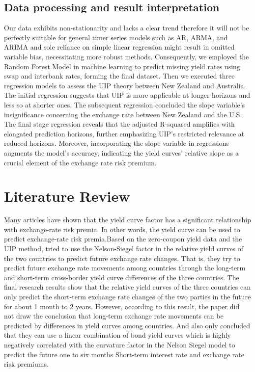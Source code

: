 \documentclass[10pt]{article}
\begin{document}
\subsection{Data processing and result interpretation}
Our data exhibits non-stationarity and lacks a clear trend therefore it will not be perfectly suitable for general timer series models such as AR, ARMA, and ARIMA and sole reliance on simple linear regression might result in omitted variable bias, necessitating more robust methods. Consequently, we employed the Random Forest Model in machine learning to predict missing yield rates using swap and interbank rates, forming the final dataset. Then we executed three regression models to assess the UIP theory between New Zealand and Australia. The initial regression suggests that UIP is more applicable at longer horizons and less so at shorter ones. The subsequent regression concluded the slope variable's insignificance concerning the exchange rate between New Zealand and the U.S. The final stage regression reveals that the adjusted R-squared amplifies with elongated prediction horizons, further emphasizing UIP's restricted relevance at reduced horizons. Moreover, incorporating the slope variable in regressions augments the model's accuracy, indicating the yield curves' relative slope as a crucial element of the exchange rate risk premium.

\section{Literature Review}
Many articles have shown that the yield curve factor has a significant relationship with exchange-rate risk premia. In other words, the yield curve can be used to predict exchange-rate risk premia.Based on the zero-coupon yield data and the UIP method, \cite{chen2013does} tried to use the Nelson-Siegel factor in the relative yield curves of the two countries to predict future exchange rate changes. That is, they try to predict future exchange rate movements among countries through the long-term and short-term cross-border yield curve differences of the three countries. The final research results show that the relative yield curves of the three countries can only predict the short-term exchange rate changes of the two parties in the future for about 1 month to 2 years. However, according to this result, the paper did not draw the conclusion that long-term exchange rate movements can be predicted by differences in yield curves among countries. And \cite{grab2018predicting} also only concluded that they can use a linear combination of bond yield curves which is highly negatively correlated with the curvature factor in the Nelson Siegel model to predict the future one to six months Short-term interest rate and exchange rate risk premiums. 
\end{document}
